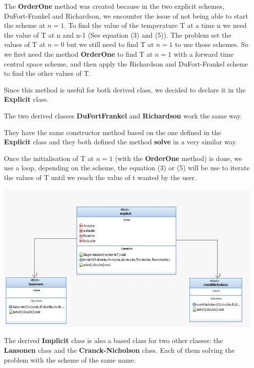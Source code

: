 \documentclass [10 pt, a4 paper]{article}
\begin{document}
The \textbf{OrderOne} method was created because in the two explicit schemes, DuFort-Frankel
and Richardson, we encounter the issue of not being able to start the scheme at $n = 1$.
To find the value of the temperature T at a time n we need the value of T at n and n-1 (See equation (3) and (5)).
The problem set the values of T at $n = 0$ but we still need to find T at $n=1$ to use those
schemes. So we first need the method \textbf{OrderOne} to find T at $n = 1$ with a forward time central
space scheme, and then apply the Richardson and DuFort-Frankel scheme to find the other values 
of T.

Since this method is useful for both derived class, we decided to declare it in the 
\textbf{Explicit} class.


The two derived classes \textbf{DuFortFrankel} and \textbf{Richardson} work the same way.

They have the same constructor method based on the one defined in the \textbf{Explicit} class
and they both defined the method \textbf{solve} in a very similar way. 

Once the initialisation of T at $n = 1$ (with the \textbf{OrderOne} method) 
is done, we use a loop, depending on the scheme, the equation (3) or (5) will be use to
iterate the values of T until we reach the value of t wanted by the user.

\begin{center} 
    \includegraphics[scale=0.6]{Chart/Implicit.JPG}
\end{center}

The derived \textbf{Implicit} class is also a based class for two other classes: the 
\textbf{Laasonen} class and the \textbf{Cranck-Nicholson} class. Each of them solving 
the problem with the scheme of the same name.
\end{document}
